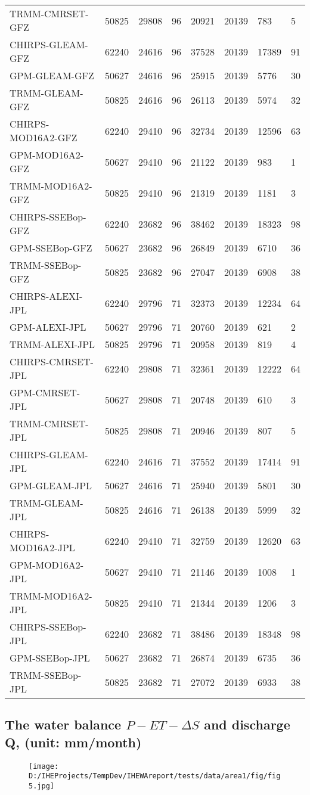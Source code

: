 \documentclass[oneside,openany]{article}%
\begin{document}
\begin{longtable}{|l|l|l|l|l|l|l|l|}
TRMM-CMRSET-GFZ&50825&29808&96&20921&20139&783&5\\%
CHIRPS-GLEAM-GFZ&62240&24616&96&37528&20139&17389&91\\%
GPM-GLEAM-GFZ&50627&24616&96&25915&20139&5776&30\\%
TRMM-GLEAM-GFZ&50825&24616&96&26113&20139&5974&32\\%
CHIRPS-MOD16A2-GFZ&62240&29410&96&32734&20139&12596&63\\%
GPM-MOD16A2-GFZ&50627&29410&96&21122&20139&983&1\\%
TRMM-MOD16A2-GFZ&50825&29410&96&21319&20139&1181&3\\%
CHIRPS-SSEBop-GFZ&62240&23682&96&38462&20139&18323&98\\%
GPM-SSEBop-GFZ&50627&23682&96&26849&20139&6710&36\\%
TRMM-SSEBop-GFZ&50825&23682&96&27047&20139&6908&38\\%
CHIRPS-ALEXI-JPL&62240&29796&71&32373&20139&12234&64\\%
GPM-ALEXI-JPL&50627&29796&71&20760&20139&621&2\\%
TRMM-ALEXI-JPL&50825&29796&71&20958&20139&819&4\\%
CHIRPS-CMRSET-JPL&62240&29808&71&32361&20139&12222&64\\%
GPM-CMRSET-JPL&50627&29808&71&20748&20139&610&3\\%
TRMM-CMRSET-JPL&50825&29808&71&20946&20139&807&5\\%
CHIRPS-GLEAM-JPL&62240&24616&71&37552&20139&17414&91\\%
GPM-GLEAM-JPL&50627&24616&71&25940&20139&5801&30\\%
TRMM-GLEAM-JPL&50825&24616&71&26138&20139&5999&32\\%
CHIRPS-MOD16A2-JPL&62240&29410&71&32759&20139&12620&63\\%
GPM-MOD16A2-JPL&50627&29410&71&21146&20139&1008&1\\%
TRMM-MOD16A2-JPL&50825&29410&71&21344&20139&1206&3\\%
CHIRPS-SSEBop-JPL&62240&23682&71&38486&20139&18348&98\\%
GPM-SSEBop-JPL&50627&23682&71&26874&20139&6735&36\\%
TRMM-SSEBop-JPL&50825&23682&71&27072&20139&6933&38\\%
\end{longtable}

%
\clearpage%
\cleardoublepage%
\subsection{The water balance $P-ET-\Delta S$ and discharge Q, (unit: mm/month)}%
\label{subsec:ThewaterbalanceP{-}ET{-}DeltaSanddischargeQ,(unitmm/month)}%


\begin{figure}[H]%
\centering%
\texttt{[image: D:/IHEProjects/TempDev/IHEWAreport/tests/data/area1/fig/fig5.jpg]}%
\label{figure:ann3}%
\end{figure}

%
\clearpage%
\cleardoublepage

%
\end{document}
